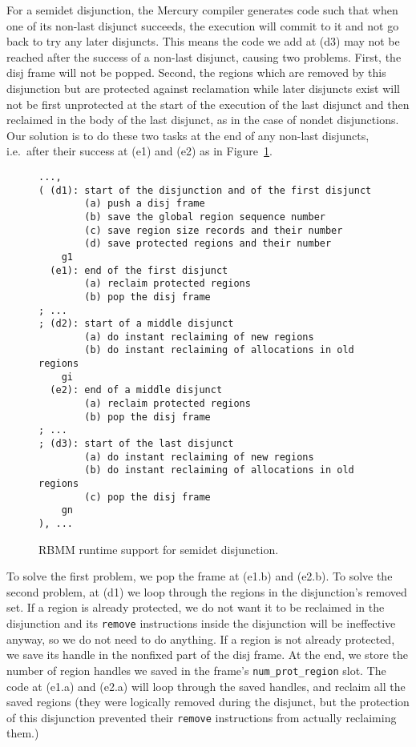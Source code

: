 \documentclass{tlp}
\newcommand{\code}[1]{{\tt#1}}
\begin{document}
For a semidet disjunction, the Mercury compiler generates code such that
when one of its non-last disjunct succeeds,
the execution will commit to it and not go back to try any later disjuncts.
This means the code we add at (d3) may not be reached
after the success of a non-last disjunct, causing two problems.
First, the disj frame will not be popped.
Second, the regions which are removed by this disjunction
but are protected against reclamation while later disjuncts exist
will not be
first unprotected at the start of the execution of the last disjunct
and then reclaimed in the body of the last disjunct,
as in the case of nondet disjunctions.
Our solution is to do these two tasks at the end of any non-last disjuncts,
i.e.\ after their success at (e1) and (e2)
as in Figure~\ref{fig:supportsemidisj}.
\begin{figure}[htb]
\scriptsize
\begin{Verbatim}[frame=single,framerule=0.2pt,framesep=3pt]
...,
( (d1): start of the disjunction and of the first disjunct
        (a) push a disj frame
        (b) save the global region sequence number
        (c) save region size records and their number
        (d) save protected regions and their number
    g1
  (e1): end of the first disjunct
        (a) reclaim protected regions
        (b) pop the disj frame
; ...
; (d2): start of a middle disjunct
        (a) do instant reclaiming of new regions
        (b) do instant reclaiming of allocations in old regions
    gi
  (e2): end of a middle disjunct
        (a) reclaim protected regions
        (b) pop the disj frame
; ...
; (d3): start of the last disjunct
        (a) do instant reclaiming of new regions
        (b) do instant reclaiming of allocations in old regions
        (c) pop the disj frame
    gn
), ...
\end{Verbatim}
\small
\caption{RBMM runtime support for semidet disjunction.}
\label{fig:supportsemidisj}
\normalsize
\end{figure}

To solve the first problem, we pop the frame at (e1.b) and (e2.b).
To solve the second problem,
at (d1) we loop through the regions in the disjunction's removed set.
If a region is already protected,
we do not want it to be reclaimed in the disjunction
and its \code{remove} instructions inside the disjunction
will be ineffective anyway,
so we do not need to do anything.
If a region is not already protected,
we save its handle in the nonfixed part of the disj frame.
At the end, we store the number of region handles we saved
in the frame's \code{num\_prot\_region} slot.
The code at (e1.a) and (e2.a) will loop through the saved handles,
and reclaim all the saved regions
(they were logically removed during the disjunct,
but the protection of this disjunction
prevented their \code{remove} instructions from actually reclaiming them.)
\end{document}
